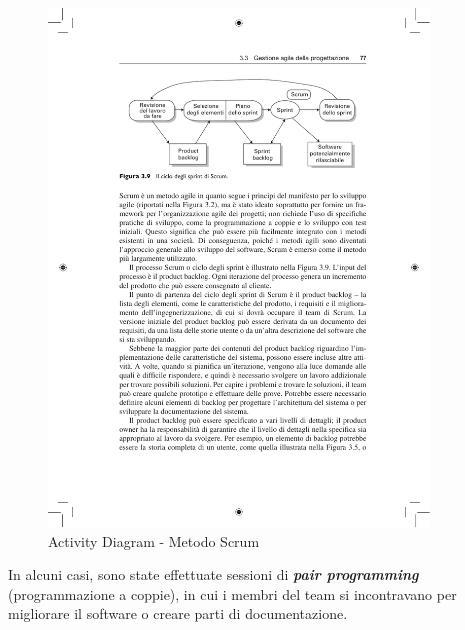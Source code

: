 \documentclass[a4paper,11pt]{article}
\begin{document}
\begin{figure}[htpb]
	\centering
	\includegraphics[width=0.9\textwidth]{diagrams/scrum.pdf}
	\caption{Activity Diagram - Metodo Scrum}
	\label{fig:scrum}
\end{figure}
\newpage
In alcuni casi, sono state effettuate sessioni di \textbf{\emph{pair programming}} (programmazione a coppie), in cui i membri del team si incontravano per migliorare il software o creare parti di documentazione.




\newpage
\end{document}
